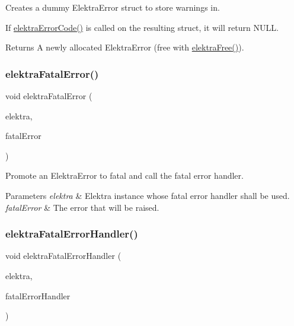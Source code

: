 Creates a dummy Elektra\+Error struct to store warnings in. 

If \hyperlink{group__highlevel_ga22c0775760a9f42f29337c06bf8b2ab5}{elektra\+Error\+Code()} is called on the resulting struct, it will return N\+U\+LL.

\begin{DoxyReturn}{Returns}
A newly allocated Elektra\+Error (free with \hyperlink{internal_8c_a7f572149d2e0bfe18023a6ac969f195c}{elektra\+Free()}). 
\end{DoxyReturn}
\mbox{\label{group__highlevel_ga57d87ff6defe4db402b772ab2a0025f9}} 
\subsubsection{\texorpdfstring{elektra\+Fatal\+Error()}{elektraFatalError()}}
{\footnotesize\ttfamily void elektra\+Fatal\+Error (\begin{DoxyParamCaption}\item[{Elektra $\ast$}]{elektra,  }\item[{Elektra\+Error $\ast$}]{fatal\+Error }\end{DoxyParamCaption})}



Promote an Elektra\+Error to fatal and call the fatal error handler. 


\begin{DoxyParams}{Parameters}
{\em elektra} & Elektra instance whose fatal error handler shall be used. \\
\hline
{\em fatal\+Error} & The error that will be raised. \\
\hline
\end{DoxyParams}
\mbox{\label{group__highlevel_ga496441e9e1dd80ed14a239dfc4c08c40}} 
\subsubsection{\texorpdfstring{elektra\+Fatal\+Error\+Handler()}{elektraFatalErrorHandler()}}
{\footnotesize\ttfamily void elektra\+Fatal\+Error\+Handler (\begin{DoxyParamCaption}\item[{Elektra $\ast$}]{elektra,  }\item[{Elektra\+Error\+Handler}]{fatal\+Error\+Handler }\end{DoxyParamCaption})}




